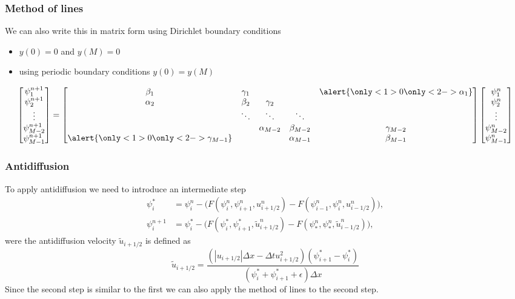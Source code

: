 \documentclass[hyperref={pdfstartview=Fit,pdfpagemode=FullScreen}]{beamer}
\providecommand{\abs}[1]{\left\lvert#1\right\rvert}
\begin{document}
\begin{frame}
\frametitle{Method of lines}
We can also write this in matrix form using Dirichlet boundary conditions
\begin{itemize}
\item {}\alert{$y(0)=0$ and $y(M)=0$}
\item {}\alert{using periodic boundary conditions $y(0)=y(M)$}
\end{itemize}
\begin{equation*}
\begin{bmatrix}\psi_{1}^{n+1}\\\psi_{2}^{n+1}\\ \vdots \\\psi_{M-2}^{n+1}\\\psi_{M-1}^{n+1}\end{bmatrix} =
\begin{bmatrix}\beta_1&\gamma_1&&&\alert{\only<1>{0}\only<2->{\alpha_1}}\\ \alpha_2&\beta_2&\gamma_2\\ &\ddots&\ddots&\ddots\\&&\alpha_{M-2}&\beta_{M-2}&\gamma_{M-2}\\\alert{\only<1>{0}\only<2->{\gamma_{M-1}}}&&&\alpha_{M-1}&\beta_{M-1}\\ \end{bmatrix}
\begin{bmatrix}\psi_{1}^n\\\psi_{2}^n\\ \vdots \\\psi_{M-2}^n\\\psi_{M-1}^n\end{bmatrix}
\end{equation*}
\end{frame}

\begin{frame}
\frametitle{Antidiffusion}
To apply antidiffusion we need to introduce an intermediate step
\begin{align*}
 \psi_i^{*} &= \psi_i^n - \Big( F \left( \psi_i^n,\psi_{i+1}^n,u_{i+1/2}^n\right)
-F \left( \psi_{i-1}^n,\psi_{i}^n,u_{i-1/2}^n\right) \Big),\\
 \psi_i^{n+1} &= \psi_i^* - \Big( F \left( \psi_i^*,\psi_{i+1}^*,\tilde{u}_{i+1/2}^n\right)
-F \left( \psi_{*}^n,\psi_{*}^n,\tilde{u}_{i-1/2}^n\right) \Big),\
\end{align*}
were the antidiffusion velocity $\tilde{u}_{i+1/2}$ is defined as
\begin{equation*}
\tilde{u}_{i+1/2} = \frac{\left(\abs{u_{i+1/2}}\Delta x - \Delta t u_{i+1/2}^2 \right) \left( \psi_{i+1}^*-\psi_i^*\right)}{ \left( \psi_i^*+\psi_{i+1}^*+\epsilon \right) \Delta x}
\end{equation*}
Since the second step is similar to the first we can also apply the method of lines to the second step.
\end{frame}
\end{document}
